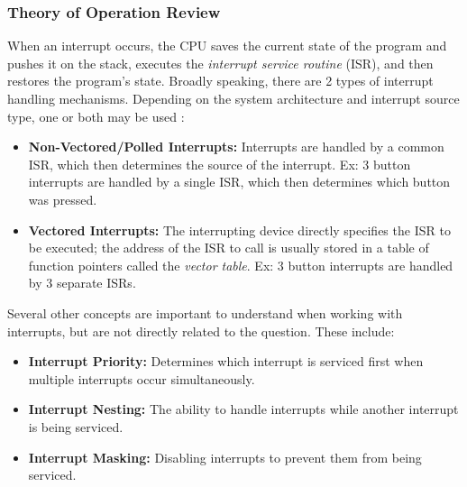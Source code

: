 \documentclass[main.tex]{subfiles}
\begin{document}
\subsubsection{Theory of Operation Review}
When an interrupt occurs, the CPU saves the current state of the program and pushes it on the stack, executes the \textit{interrupt service routine} (ISR), and then restores the program's state. \cite{white2024}
\newline
\newnoindentpara Broadly speaking, there are 2 types of interrupt handling mechanisms. Depending on the system architecture and interrupt source type, one or both may be used \cite{myersInterrupts}:
\begin{itemize}
    \item \textbf{Non-Vectored/Polled Interrupts:} Interrupts are handled by a common ISR, which then determines the source of the interrupt. Ex: 3 button interrupts are handled by a single ISR, which then determines which button was pressed.
    \item \textbf{Vectored Interrupts:} The interrupting device directly specifies the ISR to be executed; the address of the ISR to call is usually stored in a table of function pointers called the \textit{vector table}. Ex: 3 button interrupts are handled by 3 separate ISRs.
\end{itemize}

\newnoindentpara Several other concepts are important to understand when working with interrupts, but are not directly related to the question. These include:
\begin{itemize}
    \item \textbf{Interrupt Priority:} Determines which interrupt is serviced first when multiple interrupts occur simultaneously.
    \item \textbf{Interrupt Nesting:} The ability to handle interrupts while another interrupt is being serviced.
    \item \textbf{Interrupt Masking:} Disabling interrupts to prevent them from being serviced.
\end{itemize}
\end{document}
